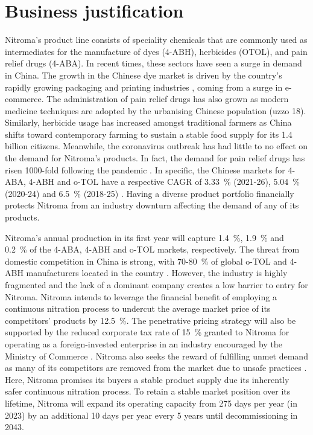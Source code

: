 \section*{Business justification}

Nitroma’s product line consists of speciality chemicals that are commonly used as intermediates for the manufacture of dyes (4-ABH), herbicides (OTOL), and pain relief drugs (4-ABA). In recent times, these sectors have seen a surge in demand in China. The growth in the Chinese dye market is driven by the country’s rapidly growing packaging and printing industries \cite{reportlinker_synthetic_2021}, coming from a surge in e-commerce. The administration of pain relief drugs has also grown as modern medicine techniques are adopted by the urbanising Chinese population (uzzo 18). Similarly, herbicide usage has increased amongst traditional farmers as China shifts toward contemporary farming to sustain a stable food supply for its 1.4 billion citizens. Meanwhile, the coronavirus outbreak has had little to no effect on the demand for Nitroma’s products. In fact, the demand for pain relief drugs has risen 1000-fold following the pandemic \cite{beroe_inc_coronavirus_2020}. In specific, the Chinese markets for 4-ABA, 4-ABH and o-TOL have a respective CAGR of \SI{3.33}{\percent} (2021-26), \SI{5.04}{\percent} (2020-24) and \SI{6.5}{\percent} (2018-25) \cite{wboc_global_2021,sumant_herbicides_2019,blad_game_nodate}. Having a diverse product portfolio financially protects Nitroma from an industry downturn affecting the demand of any of its products.

Nitroma’s annual production in its first year will capture \SI{1.4}{\percent}, \SI{1.9}{\percent} and \SI{0.2}{\percent} of the 4-ABA, 4-ABH and o-TOL markets, respectively. The threat from domestic competition in China is strong, with 70-\SI{80}{\percent} of global o-TOL and 4-ABH manufacturers located in the country \cite{molbase_chemical_e-commerce_4-amino-benzaldehyde_2020,panjiva_manufacturers_2021,chemexper_chemical_nodate}. However, the industry is highly fragmented and the lack of a dominant company creates a low barrier to entry for Nitroma. Nitroma intends to leverage the financial benefit of employing a continuous nitration process to undercut the average market price of its competitors’ products by \SI{12.5}{\percent}.  The penetrative pricing strategy will also be supported by the reduced corporate tax rate of \SI{15}{\percent} granted to Nitroma for operating as a foreign-invested enterprise in an industry encouraged by the Ministry of Commerce \cite{ministry_of_commerce_china_catalouge_2020}. Nitroma also seeks the reward of fulfilling unmet demand as many of its competitors are removed from the market due to unsafe practices \cite{kielburger_chinese_2019}. Here, Nitroma promises its buyers a stable product supply due its inherently safer continuous nitration process. To retain a stable market position over its lifetime, Nitroma will expand its operating capacity from 275 days per year (in 2023) by an additional 10 days per year every 5 years until decommissioning in 2043.

